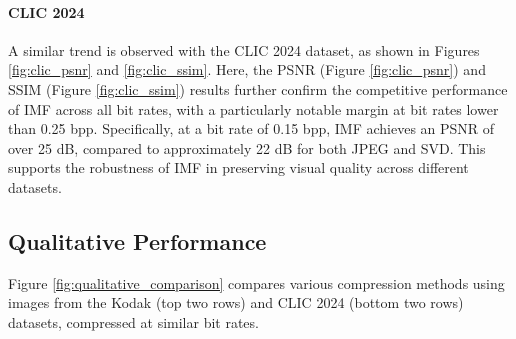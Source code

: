 \paragraph{CLIC 2024}
A similar trend is observed with the CLIC 2024 dataset, as shown in Figures \ref{fig:clic_psnr} and \ref{fig:clic_ssim}. Here, the PSNR (Figure \ref{fig:clic_psnr}) and SSIM (Figure \ref{fig:clic_ssim}) results further confirm the competitive performance of IMF across all bit rates, with a particularly notable margin at bit rates lower than 0.25 bpp. Specifically, at a bit rate of 0.15 bpp, IMF achieves an PSNR of over 25 dB, compared to approximately 22 dB for both JPEG and SVD. This supports the robustness of IMF in preserving visual quality across different datasets.

\subsection{Qualitative Performance}

Figure \ref{fig:qualitative_comparison} compares various compression methods using images from the Kodak (top two rows) and CLIC 2024 (bottom two rows) datasets, compressed at similar bit rates.

